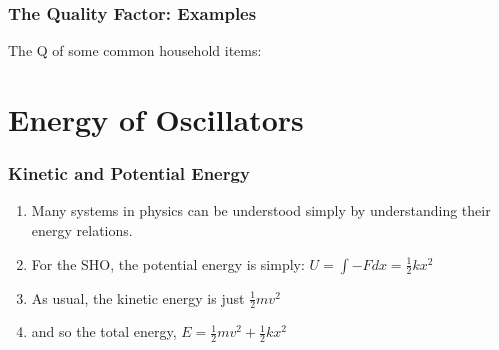 \documentclass[pdf,hideothersubsections]{beamer}
\begin{document}
\begin{frame}
\frametitle{The Quality Factor: Examples}

The Q of some common household items:
\begin{table}
\centering
\end{table}



\end{frame}


\section{Energy of Oscillators}
\begin{frame}
\frametitle{Kinetic and Potential Energy}
\pause
\begin{enumerate}
\item Many systems in physics can be understood simply by
  understanding their energy relations.
\pause
\item For the SHO, the potential energy is simply: $U = \int{-F dx} =
  \frac{1}{2}k x^2$
\pause
\item As usual, the kinetic energy is just $\frac{1}{2} m v^2$
\pause
\item and so the total energy, $E =  \frac{1}{2} m v^2 + \frac{1}{2}k x^2$
\end{enumerate}

\end{frame}
\end{document}
